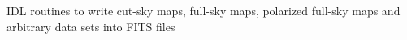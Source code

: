   \item[%
\htmlref{write\_fits\_cut4}{idl:write_fits_cut4},
\htmlref{write\_fits\_map}{idl:write_fits_map}]
  \item[%
\htmlref{write\_tqu}{idl:write_tqu},
\htmlref{write\_fits\_sb}{idl:write_fits_sb}]
\healpix IDL routines to write cut-sky maps, full-sky maps, polarized full-sky maps and
arbitrary data sets into FITS files
